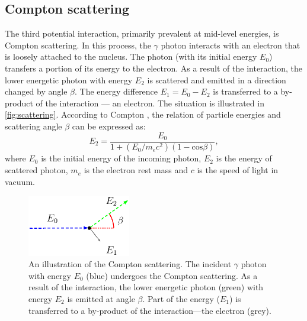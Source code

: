\subsection{Compton scattering}
The third potential interaction, primarily prevalent at mid-level energies, is Compton scattering.
In this process, the $\gamma$ photon interacts with an electron that is loosely attached to the nucleus. 
The photon (with its initial energy $E_{0}$) transfers a portion of its energy to the electron.
As a result of the interaction, the lower energetic photon with energy $E_{2}$ is scattered and emitted in a direction changed by angle $\beta$. 
The energy difference $E_{1} = E_{0} - E_{2}$ is transferred to a by-product of the interaction --- an electron.
The situation is illustrated in \autoref{fig:scattering}.
According to Compton \cite{compton}, the relation of particle energies and scattering angle $\beta$ can be expressed as:
\begin{equation}
E_{2} = \frac{E_{0}}{  1 + (E_{0} / m_{e}c^{2}) (1 - \mathrm{cos} \beta)},
  \label{eq:compton_energies}
\end{equation}
where $E_{0}$ is the initial energy of the incoming photon, $E_{2}$ is the energy of scattered photon,  $m_{e}$ is the electron rest mass and $c$ is the speed of light in vacuum. 
\begin{figure}[!h]
    \centering
    \includegraphics[width=0.4\textwidth]{./fig/photos/compton_simple2.eps}
    \caption{An illustration of the Compton scattering. The incident $\gamma$ photon with energy $E_{0}$ (blue) undergoes the Compton scattering. As a result of the interaction, the lower energetic photon (green) with energy $E_{2}$ is emitted at angle $\beta$. Part of the energy ($E_{1}$) is transferred to a by-product of the interaction---the electron (grey).}
    \label{fig:scattering}
\end{figure}
